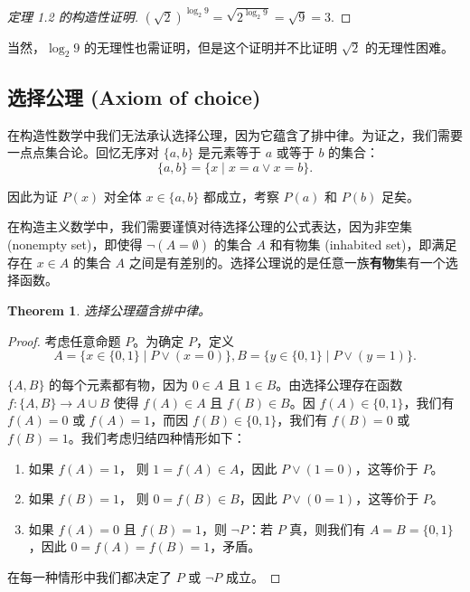 \documentclass{ctexart}
\newtheorem{theorem}{Theorem}
\begin{document}
        \begin{proof}[定理 1.2 的构造性证明]
            \( (\sqrt{2}) ^ {\log_2 9} = \sqrt{2 ^ {\log_2 9}} = \sqrt{9} = 3.\)
        \end{proof}

        当然，\( \log_2 9 \) 的无理性也需证明，但是这个证明并不比证明 \( \sqrt{2} \) 的无理性困难。

    \subsection{选择公理 (Axiom of choice)}
      在构造性数学中我们无法承认选择公理，因为它蕴含了排中律。为证之，我们需要一点点集合论。回忆无序对 \( \{a, b\} \) 是元素等于 \( a \) 或等于 \( b \) 的集合：
      \[
      \{a, b\} = \{x \mid x = a \lor x = b\}.
      \]

      因此为证 \( P(x) \) 对全体 \(x \in \{a, b\} \) 都成立，考察 \( P(a) \) 和 \( P(b) \) 足矣。

      在构造主义数学中，我们需要谨慎对待选择公理的公式表达，因为非空集 (nonempty set)，即使得 \(\neg (A = \emptyset) \) 的集合 \( A \)  和有物集 (inhabited set)，即满足存在 \(x \in A\) 的集合 \( A \) 之间是有差别的。选择公理说的是任意一族\textbf{有物}集有一个选择函数。

      \begin{theorem}
          选择公理蕴含排中律。
      \end{theorem}

      \begin{proof}
          考虑任意命题 \( P \)。为确定 \( P \)，定义
          \[
          A = \{x \in \{0, 1\} \mid P \lor (x = 0)\},
          B = \{y \in \{0, 1\} \mid P \lor (y = 1)\}.
          \]

          \( \{A, B\} \) 的每个元素都有物，因为 \(0 \in A\) 且 \(1 \in B\)。由选择公理存在函数 \(f : \{A, B\} \to A \cup B\) 使得 \(f(A) \in A\) 且 \(f(B) \in B\)。因 \( f(A) \in \{0, 1\}\)，我们有 \(f (A) = 0\) 或 \(f (A) = 1\)，而因 \( f(B) \in \{0, 1\}\)，我们有 \(f (B) = 0\) 或 \(f (B) = 1\)。我们考虑归结四种情形如下：

          \begin{enumerate}
              \item 如果 \(f(A) = 1\)， 则 \(1 = f (A) \in A\)，因此 \(P \vee (1 = 0)\)，这等价于 \(P\)。
              \item 如果 \(f(B) = 1\)， 则 \(0 = f (B) \in B\)，因此 \(P \vee (0 = 1)\)，这等价于 \(P\)。
              \item 如果 \(f (A) = 0\) 且 \(f (B) = 1\)，则 \(\neg P\)：若 \(P\) 真，则我们有 \(A = B = \{0, 1\}\)，因此 \(0 = f(A) = f(B) = 1\)，矛盾。
          \end{enumerate}
          
          在每一种情形中我们都决定了 \(P\) 或 \(\neg P\) 成立。
      \end{proof}
\end{document}
